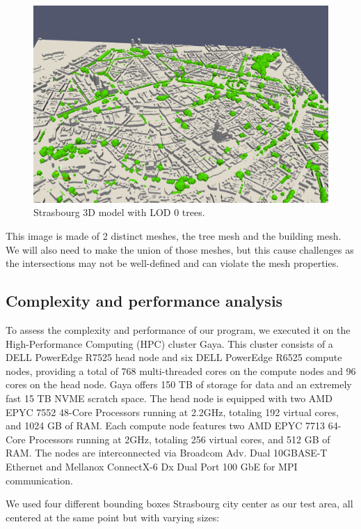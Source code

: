 \documentclass[12pt]{article}
\begin{document}
\begin{figure}[H]
    \centering
    \includegraphics[width=1\textwidth]{images/stras_lod0.png}
    \caption{Strasbourg 3D model with LOD 0 trees.}
\end{figure}

This image is made of 2 distinct meshes, the tree mesh and the building mesh.
We will also need to make the union of those meshes, but this cause challenges 
as the intersections may not be well-defined and can violate the mesh properties.

\subsection{Complexity and performance analysis}

To assess the complexity and performance of our program, we executed it on
the High-Performance Computing (HPC) cluster Gaya. This cluster consists of a
DELL PowerEdge R7525 head node and six DELL PowerEdge R6525 compute nodes,
providing a total of 768 multi-threaded cores on the compute nodes and 96 cores
on the head node. Gaya offers 150 TB of storage for data and an extremely fast
15 TB NVME scratch space. The head node is equipped with two AMD EPYC 7552
48-Core Processors running at 2.2GHz, totaling 192 virtual cores, and 1024
GB of RAM. Each compute node features two AMD EPYC 7713 64-Core Processors
running at 2GHz, totaling 256 virtual cores, and 512 GB of RAM.
The nodes are interconnected via Broadcom Adv. Dual 10GBASE-T Ethernet and
Mellanox ConnectX-6 Dx Dual Port 100 GbE for MPI communication.

We used four different bounding boxes Strasbourg city center as our test area, all centered at the same point but with
varying sizes:
\end{document}
